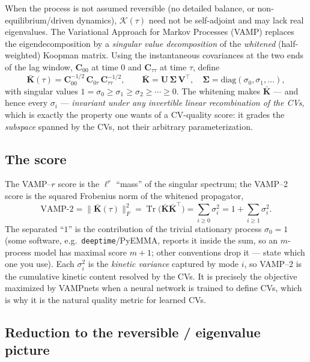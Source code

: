 \documentclass[11pt]{article}
\theoremstyle{plain}
\theoremstyle{definition}
\newcommand{\Kop}{\mathcal{K}}
\newcommand{\Cmat}{\mathbf{C}}
\DeclareMathOperator{\Tr}{Tr}
\begin{document}
When the process is not assumed reversible (no detailed balance, or
non-equilibrium/driven dynamics), $\Kop(\tau)$ need not be self-adjoint and may lack
real eigenvalues. The Variational Approach for Markov Processes (VAMP) replaces the
eigendecomposition by a \emph{singular value decomposition} of the
\emph{whitened} (half-weighted) Koopman matrix. Using the instantaneous covariances
at the two ends of the lag window, $\Cmat_{00}$ at time $0$ and $\Cmat_{\tau\tau}$ at
time $\tau$, define
\begin{equation}
\bar{\mathbf K}(\tau)=\Cmat_{00}^{-1/2}\,\Cmat_{0\tau}\,\Cmat_{\tau\tau}^{-1/2},
\qquad
\bar{\mathbf K}=\mathbf U\,\bm\Sigma\,\mathbf V^\top,\quad
\bm\Sigma=\mathrm{diag}(\sigma_0,\sigma_1,\dots),
\label{eq:whitened}
\end{equation}
with singular values $1=\sigma_0\ge\sigma_1\ge\sigma_2\ge\cdots\ge0$. The whitening
makes $\bar{\mathbf K}$ --- and hence every $\sigma_i$ --- \emph{invariant under any
invertible linear recombination of the CVs}, which is exactly the property one wants
of a CV-quality score: it grades the \emph{subspace} spanned by the CVs, not their
arbitrary parameterization.

\subsection{The score}

The VAMP--$r$ score is the $\ell^r$ ``mass'' of the singular spectrum; the VAMP--2
score is the squared Frobenius norm of the whitened propagator,
\begin{equation}
\boxed{\;
\mathrm{VAMP\text{-}2}
=\big\|\bar{\mathbf K}(\tau)\big\|_F^{2}
=\Tr\!\big(\bar{\mathbf K}\bar{\mathbf K}^\top\big)
=\sum_{i\ge0}\sigma_i^{2}
=1+\sum_{i\ge1}\sigma_i^{2}.
\;}
\label{eq:vamp2}
\end{equation}
The separated ``$1$'' is the contribution of the trivial stationary process
$\sigma_0=1$ (some software, e.g.\ \texttt{deeptime}/PyEMMA, reports it inside the sum,
so an $m$-process model has maximal score $m{+}1$; other conventions drop it ---
state which one you use). Each $\sigma_i^2$ is the \emph{kinetic variance} captured
by mode $i$, so VAMP--2 is the cumulative kinetic content resolved by the CVs. It is
precisely the objective maximized by VAMPnets when a neural network is trained to
define CVs, which is why it is the natural quality metric for learned CVs.

\subsection{Reduction to the reversible / eigenvalue picture}
\end{document}
